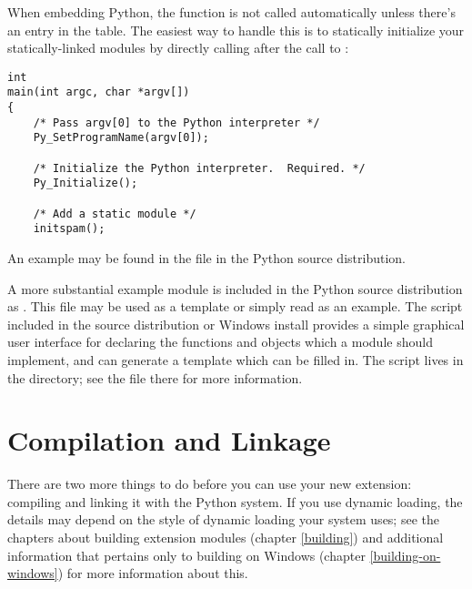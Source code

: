 When embedding Python, the  function is not
called automatically unless there's an entry in the
 table.  The easiest way to handle this is to 
statically initialize your statically-linked modules by directly
calling  after the call to
:

\begin{verbatim}
int
main(int argc, char *argv[])
{
    /* Pass argv[0] to the Python interpreter */
    Py_SetProgramName(argv[0]);

    /* Initialize the Python interpreter.  Required. */
    Py_Initialize();

    /* Add a static module */
    initspam();
\end{verbatim}

An example may be found in the file  in the
Python source distribution.


A more substantial example module is included in the Python source
distribution as .  This file may be used as a 
template or simply read as an example.  The 
script included in the source distribution or Windows install provides 
a simple graphical user interface for declaring the functions and
objects which a module should implement, and can generate a template
which can be filled in.  The script lives in the
 directory; see the  file there
for more information.


\section{Compilation and Linkage
         \label{compilation}}

There are two more things to do before you can use your new extension:
compiling and linking it with the Python system.  If you use dynamic
loading, the details may depend on the style of dynamic loading your
system uses; see the chapters about building extension modules
(chapter \ref{building}) and additional information that pertains only
to building on Windows (chapter \ref{building-on-windows}) for more
information about this.

